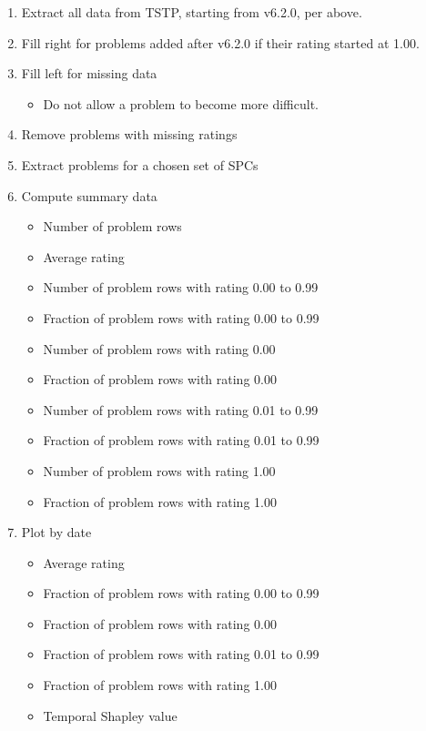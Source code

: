 \documentclass[runningheads]{llncs}
\begin{document}
\begin{enumerate}
\item Extract all data from TSTP, starting from v6.2.0, per above.
\item Fill right for problems added after v6.2.0 if their rating started at 1.00. 
\item Fill left for missing data
      \begin{itemize}
      \item Do not allow a problem to become more difficult.
      \end{itemize}
\item Remove problems with missing ratings
\item Extract problems for a chosen set of SPCs 
\item Compute summary data
      \begin{itemize}
      \item Number of problem rows
      \item Average rating
      \item Number of problem rows with rating 0.00 to 0.99
      \item Fraction of problem rows with rating 0.00 to 0.99
      \item Number of problem rows with rating 0.00
      \item Fraction of problem rows with rating 0.00
      \item Number of problem rows with rating 0.01 to 0.99
      \item Fraction of problem rows with rating 0.01 to 0.99
      \item Number of problem rows with rating 1.00
      \item Fraction of problem rows with rating 1.00
      \end{itemize}
\item Plot by date
      \begin{itemize}
      \item Average rating
      \item Fraction of problem rows with rating 0.00 to 0.99
      \item Fraction of problem rows with rating 0.00
      \item Fraction of problem rows with rating 0.01 to 0.99
      \item Fraction of problem rows with rating 1.00
      \item Temporal Shapley value
      \end{itemize}
\end{enumerate}
\end{document}
